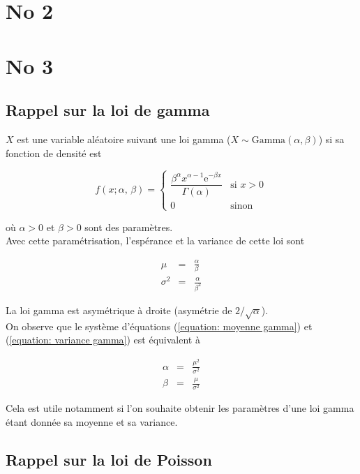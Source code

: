 \documentclass[letterpaper,11pt]{article}
\renewcommand{\exp}[1]{\mathrm{e}^{#1}}
\begin{document}
\section{No 2}

\section{No 3}

\subsection{Rappel sur la loi de gamma}

$X$ est une variable aléatoire suivant une loi gamma ($X\sim\mathrm{Gamma}(\alpha,\beta)$) si sa fonction de densité est

\begin{equation}
f(x; \alpha,\,\beta) =  
\left\{
\begin{array}{cl}
\dfrac{\beta^{\alpha} x^{\alpha-1} \exp{-\beta x}}{\Gamma(\alpha)} & \text{si } x>0\\[0.4cm]
0 & \text{sinon}
\end{array}
\right.
\end{equation}

où $\alpha>0$ et $\beta>0$ sont des paramètres. \\
Avec cette paramétrisation, l'espérance et la variance de cette loi sont

\begin{eqnarray} 
\mu      &=& \frac{\alpha}{\beta} \label{equation: moyenne gamma}\\
\sigma^2 &=& \frac{\alpha}{\beta^2} \label{equation: variance gamma}
\end{eqnarray}

La loi gamma est asymétrique à droite (asymétrie de $2/\sqrt{\alpha}$).\\
On observe que le système d'équations (\ref{equation: moyenne gamma}) et (\ref{equation: variance gamma}) est équivalent à

\begin{eqnarray}
\alpha   &=& \frac{\mu^2}{\sigma^2} \label{equation: alpha gamma}\\
\beta &=& \frac{\mu}{\sigma^2} \label{equation: beta gamma}
\end{eqnarray}

Cela est utile notamment si l'on souhaite obtenir les paramètres d'une loi gamma étant donnée sa moyenne et sa variance.

\subsection{Rappel sur la loi de Poisson}
\end{document}
